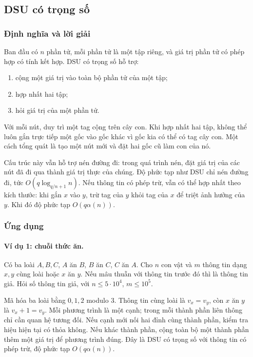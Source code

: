 \documentclass[11pt]{article}
\begin{document}
\subsection{DSU có trọng số}

\subsubsection{Định nghĩa và lời giải}

Ban đầu có \(n\) phần tử, mỗi phần tử là một tập riêng, và giá trị phần tử có
phép hợp có tính kết hợp. DSU có trọng số hỗ trợ:
\begin{enumerate}
  \item cộng một giá trị vào toàn bộ phần tử của một tập;
  \item hợp nhất hai tập;
  \item hỏi giá trị của một phần tử.
\end{enumerate}

Với mỗi nút, duy trì một tag cộng trên cây con. Khi hợp nhất hai tập, không thể
luôn gắn trực tiếp một gốc vào gốc khác vì gốc kia có thể có tag cây con. Một
cách tổng quát là tạo một nút mới và đặt hai gốc cũ làm con của nó.

Cấu trúc này vẫn hỗ trợ nén đường đi: trong quá trình nén, đặt giá trị của các
nút đã đi qua thành giá trị thực của chúng. Độ phức tạp như DSU chỉ nén đường
đi, tức \(O(q\log_{q/n+1}n)\). Nếu thông tin có phép trừ, vẫn có thể hợp nhất
theo kích thước: khi gắn \(x\) vào \(y\), trừ tag của \(y\) khỏi tag của \(x\)
để triệt ảnh hưởng của \(y\). Khi đó độ phức tạp \(O(q\alpha(n))\).

\subsubsection{Ứng dụng}

\paragraph{Ví dụ 1: chuỗi thức ăn.}
Có ba loài \(A,B,C\), \(A\) ăn \(B\), \(B\) ăn \(C\), \(C\) ăn \(A\). Cho
\(n\) con vật và \(m\) thông tin dạng \(x,y\) cùng loài hoặc \(x\) ăn \(y\).
Nếu mâu thuẫn với thông tin trước đó thì là thông tin giả. Hỏi số thông tin
giả, với \(n\le 5\cdot 10^4\), \(m\le 10^5\).

Mã hóa ba loài bằng \(0,1,2\) modulo \(3\). Thông tin cùng loài là \(v_x=v_y\),
còn \(x\) ăn \(y\) là \(v_x+1=v_y\). Mỗi phương trình là một cạnh; trong mỗi
thành phần liên thông chỉ cần quan hệ tương đối. Nếu cạnh mới nối hai đỉnh cùng
thành phần, kiểm tra hiệu hiện tại có thỏa không. Nếu khác thành phần, cộng
toàn bộ một thành phần thêm một giá trị để phương trình đúng. Đây là DSU có
trọng số với thông tin có phép trừ, độ phức tạp \(O(q\alpha(n))\).
\end{document}
